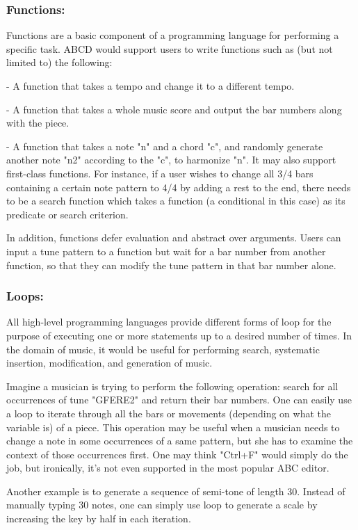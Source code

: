 	\subsubsection{Functions:}
	Functions are a basic component of a programming language for performing a specific task. ABCD would support users to write functions such as (but not limited to) the following:

	- A function that takes a tempo and change it to a different tempo.

 	- A function that takes a whole music score and output the bar numbers along with the piece.
 	
	- A function that takes a note "n" and a chord "c", and randomly generate another note "n2" according to the "c", to harmonize "n".
	  It may also support first-class functions. For instance, if a user wishes to change all 3/4 bars containing a certain note pattern to 4/4 by adding a rest to the end, there needs to be a search function which takes a function (a conditional in this case) as its predicate or search criterion. 

	 In addition, functions defer evaluation and abstract over arguments. Users can input a tune pattern to a function but wait for a bar number from another function, so that they can modify the tune pattern in that bar number alone.  

	\subsubsection{Loops:}
	All high-level programming languages provide different forms of loop for the purpose of executing one or more statements up to a desired number of times. In the domain of music, it would be useful for performing search, systematic insertion, modification, and generation of music. 

	Imagine a musician is trying to perform the following operation: search for all occurrences of tune "GFERE2" and return their bar numbers. One can easily use a loop to iterate through all the bars or movements (depending on what the variable is) of a piece. This operation may be useful when a musician needs to change a note in some occurrences of a same pattern, but she has to examine the context of those occurrences first. One may think "Ctrl+F" would simply do the job, but ironically, it's not even supported in the most popular ABC editor\cite{SlashdotMedia17}.  

	Another example is to generate a sequence of semi-tone of length 30. Instead of manually typing 30 notes, one can simply use loop to generate a scale by increasing the key by half in each iteration.

